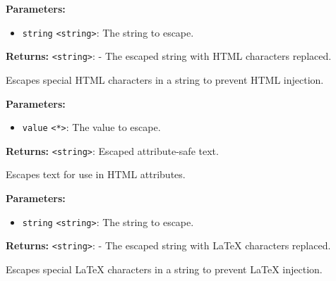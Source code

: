 \documentclass[12pt,a4paper]{article}
\begin{document}
\vspace{5mm}
\noindent {}


\noindent \textbf{Parameters:}
\begin{itemize}
  \item \texttt{string} \texttt{<string>}: The string to escape.
\end{itemize}

\noindent \textbf{Returns:} \texttt{<string>}: - The escaped string with HTML characters replaced.

\noindent Escapes special HTML characters in a string to prevent HTML injection.

\vspace{5mm}
\noindent {}


\noindent \textbf{Parameters:}
\begin{itemize}
  \item \texttt{value} \texttt{<*>}: The value to escape.
\end{itemize}

\noindent \textbf{Returns:} \texttt{<string>}: Escaped attribute-safe text.

\noindent Escapes text for use in HTML attributes.

\vspace{5mm}
\noindent {}


\noindent \textbf{Parameters:}
\begin{itemize}
  \item \texttt{string} \texttt{<string>}: The string to escape.
\end{itemize}

\noindent \textbf{Returns:} \texttt{<string>}: - The escaped string with LaTeX characters replaced.

\noindent Escapes special LaTeX characters in a string to prevent LaTeX injection.

\vspace{5mm}
\noindent {}
\end{document}
